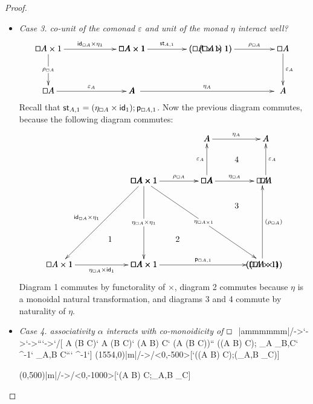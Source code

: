 \documentclass{article}
\let\Diamond\relax
\renewcommand{\Box}{\oblong}
\newcommand{\pd}[0]{\times}
\newcommand{\st}[2]{\mathsf{st}_{#1,#2}}
\newcommand{\id}[0]{\mathsf{id}}
\newcommand{\m}[1]{\mathsf{m}_{#1}}
\newcommand{\p}[1]{\mathsf{p}_{#1}}
\begin{document}
\begin{proof}
\begin{itemize}
  \item[] \textit{Case 3. co-unit of the comonad $\varepsilon$ and unit of the monad $\eta$ interact well?}
    $$
    \bfig
    \hSquares|aamaaaa|/->`->`->```->`/[
      \Box A \times 1`
      \Box A \times \Diamond 1`
      \Diamond (\Box A \times 1)`
      \Box A`
      A`
      ;
      \id_{\Box A} \times \eta_1`
      \st{A}{1}`
      \rho_{\Box A}```
      \varepsilon_A`]
    \qtriangle(1978,0)/->``->/<800,500>[\Diamond (\Box A \times 1)`\Diamond\Box A`\Diamond A;\Diamond \rho_{\Box A}``\Diamond\varepsilon_A]
    \morphism(1060,0)/->/<1640,0>[`;\eta_A]
    \efig
    $$
    \noindent
    Recall that
    $\st{A}{1} = (\eta_{\Box A} \pd \id_{\Diamond 1});\p{\Box A,1}$.
    Now the previous diagram commutes, because the following diagram commutes:
    $$
    \bfig
    \btriangle|mma|<1444,1000>[\Box A \pd 1`\Diamond\Box A \pd \Diamond 1`\Diamond(\Box A \pd 1);\eta_{\Box A} \pd \eta_1`\eta_{\Box A \pd 1}`\p{\Box A,1}]
    \dtriangle(-1000,0)/->``->/<1000,1000>[\Box A \pd 1`\Box A \pd 1`\Diamond\Box A \pd \Diamond 1;\id_{\Box A} \pd \eta_1``\eta_{\Box A} \pd
      \id_{\Diamond 1}]

    \hSquares(0,0)/->`->```<-``/<1000>[\Box A \pd 1`\Box A`\Diamond\Box A```\Diamond (\Box A \times 1);\rho_{\Box A}`\eta_{\Box A}```\Diamond (\rho_{\Box A})``]

    \square(746,1000)/->`<-`<-`/<698,500>[A`\Diamond A`\Box A`\Diamond\Box A;\eta_A`\varepsilon_A`\Diamond\varepsilon_A`]

    \place(-400,300)[1]
    \place(400,300)[2]
    \place(1100,700)[3]
    \place(1100,1250)[4]
    \efig
    $$
    \noindent
    Diagram 1 commutes by functorality of $\times$, diagram 2 commutes
    because $\eta$ is a monoidal natural transformation, and diagrams
    3 and 4 commute by naturality of $\eta$.

  \item[] \textit{Case 4. associativity $\alpha$ interacts with co-monoidicity of $\Box$}
    $$
    \bfig
    \vSquares|ammmmmm|/->`->`->```->`/[
      \Box A \times (\Box B \times \Diamond C)`
      \Box A \times \Diamond(\Box B \times C)`
      (\Box A \times \Box B) \times \Diamond C`
      \Diamond(\Box A \times (\Box B \times C))``
      \Diamond((\Box A \times \Box B) \times C);
      \id_{\Box A} \pd \st{B}{C}`
      \alpha^{-1}`
      \st{A}{\Box B \times C}```
      \Diamond\alpha^{-1}`]
    \morphism(1554,0)|m|/->/<0,-500>[`\Diamond(\Box(A \times B) \times C);\Diamond(\m{A,B} \times \id_C)]
    
    \morphism(0,500)|m|/->/<0,-1000>[`\Box(A \times B) \times \Diamond C;\m{A,B} \times \id_{\Diamond C}]


\end{itemize}
\end{proof}
\end{document}
